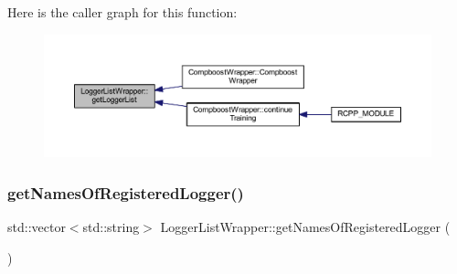 Here is the caller graph for this function\+:\nopagebreak
\begin{figure}[H]
\begin{center}
\leavevmode
\includegraphics[width=350pt]{class_logger_list_wrapper_ab128c208c6cd017de1cfe08f3e996b2a_icgraph}
\end{center}
\end{figure}
\mbox{\label{class_logger_list_wrapper_a0bb53b6ac23b216e4f2f55757c99a458}} 
\subsubsection{\texorpdfstring{get\+Names\+Of\+Registered\+Logger()}{getNamesOfRegisteredLogger()}}
{\footnotesize\ttfamily std\+::vector$<$std\+::string$>$ Logger\+List\+Wrapper\+::get\+Names\+Of\+Registered\+Logger (\begin{DoxyParamCaption}{ }\end{DoxyParamCaption})\hspace{0.3cm}{\ttfamily [inline]}}

